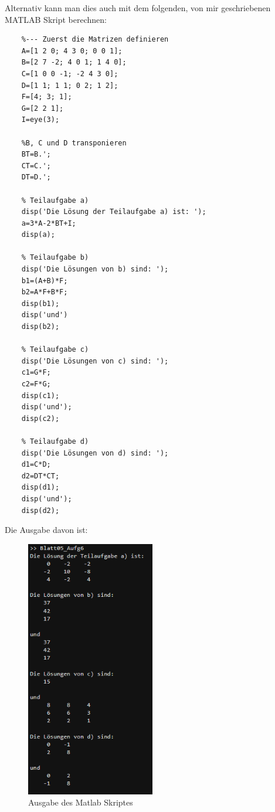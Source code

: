 Alternativ kann man dies auch mit dem folgenden, von mir geschriebenen MATLAB Skript berechnen:
\begin{verbatim}
    %--- Zuerst die Matrizen definieren
    A=[1 2 0; 4 3 0; 0 0 1];
    B=[2 7 -2; 4 0 1; 1 4 0];
    C=[1 0 0 -1; -2 4 3 0];
    D=[1 1; 1 1; 0 2; 1 2];
    F=[4; 3; 1];
    G=[2 2 1];
    I=eye(3);
    
    %B, C und D transponieren
    BT=B.';
    CT=C.';
    DT=D.';
    
    % Teilaufgabe a)
    disp('Die Lösung der Teilaufgabe a) ist: ');
    a=3*A-2*BT+I;
    disp(a);
    
    % Teilaufgabe b)
    disp('Die Lösungen von b) sind: ');
    b1=(A+B)*F;
    b2=A*F+B*F;
    disp(b1);
    disp('und')
    disp(b2);
    
    % Teilaufgabe c)
    disp('Die Lösungen von c) sind: ');
    c1=G*F;
    c2=F*G;
    disp(c1);
    disp('und');
    disp(c2);
    
    % Teilaufgabe d)
    disp('Die Lösungen von d) sind: ');
    d1=C*D;
    d2=DT*CT;
    disp(d1);
    disp('und');
    disp(d2);  
\end{verbatim}

Die Ausgabe davon ist: \\

\begin{figure}
     \centering
     \includegraphics[width=0.5\textwidth]{Aufgaben/06/image.png}
     \caption{Ausgabe des Matlab Skriptes}
     \label{fig:enter-label}
 \end{figure}
